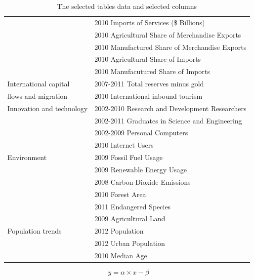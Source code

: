 \documentclass[a4paper,11pt]{article}
\begin{document}
\begin{table}
\begin{tabular}{|l|l|}
		& 2010 Imports of Services (\$ Billions)\\
		& 2010 Agricultural Share of Merchandise Exports\\
		& 2010 Manufactured Share of Merchandise Exports\\
		& 2010 Agricultural Share of Imports \\
		& 2010 Manufacutured Share of Imports \\
		\hline
		International capital & 2007-2011 Total reserves minus gold\\
		flows and migration & 2010 International inbound tourism\\
		\hline
		Innovation and technology & 2002-2010 Research and Development Researchers\\
		& 2002-2011 Graduates in Science and Engineering\\
		& 2002-2009 Personal Computers\\
		& 2010 Internet Users\\
		\hline
		Environment & 2009 Fossil Fuel Usage\\
		& 2009 Renewable Energy Usage\\ 
		& 2008 Carbon Dioxide Emissions\\
		& 2010 Forest Area\\ 
		& 2011 Endangered Species\\
		& 2009 Agricultural Land\\
		\hline
		Population trends & 2012 Population\\
		& 2012 Urban Population\\
		& 2010 Median Age\\
		\hline
	\end{tabular}
	\caption{The selected tables data and selected columns}
	\label{Tab:dataSelect}
\end{table}

\begin{equation}
	y = \alpha \times x -\beta
	\label{func:function}
\end{equation}

{}

\end{document}
